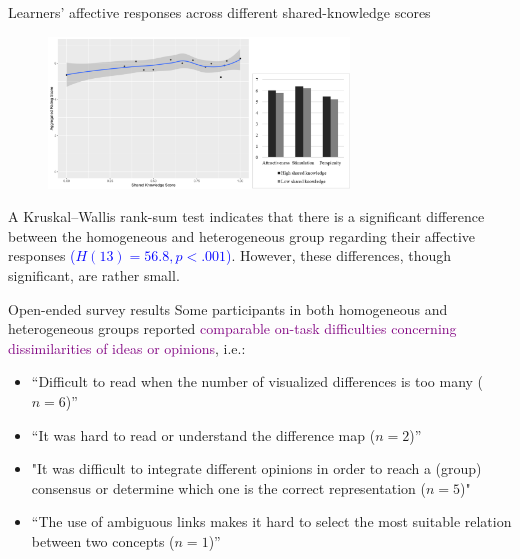 \begin{frame}{Learners' affective responses across  different  shared-knowledge scores}
    \begin{figure}[tb]
     \begin{center}
      \includegraphics[width=80mm]{images/rqb_affective-response-redraw.pdf}
      \end{center}
      \label{rqb::affective}  
    \end{figure}
    
    A Kruskal–Wallis rank-sum test indicates that there is a significant difference between the homogeneous and heterogeneous group regarding their affective responses \textcolor{blue}{($H(13) = 56.8, p < .001$)}. However, these differences, though significant, are rather small.

\end{frame}

\begin{frame}{Open-ended survey results}
Some participants in both homogeneous and
heterogeneous groups reported \textcolor{purple}{comparable on-task 
difficulties concerning dissimilarities of ideas or 
opinions}, i.e.:
{\small
\begin{itemize}
    \item “Difficult to read when the number of visualized differences is too many ($n = 6$)”
    \item “It was hard to read or understand the difference map ($n = 2$)”
    \item "It was difficult to integrate different opinions in order to reach a (group) consensus or determine which one is the correct representation ($n = 5$)"
    \item “The use of ambiguous links makes it hard to select the most suitable relation between two concepts ($n = 1$)”
\end{itemize} 
}
\end{frame}

